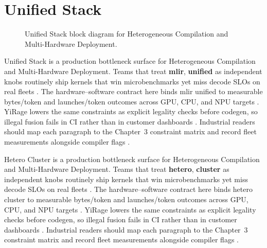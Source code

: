 \section{Unified Stack}
\label{sec:unified_stack}
\begin{figure}[t]
\centering
{}
\caption{Unified Stack block diagram for Heterogeneous Compilation and Multi-Hardware Deployment.}
\label{fig:unified_stack_architecture}
\end{figure}


Unified Stack is a production bottleneck surface for Heterogeneous Compilation and Multi-Hardware Deployment. Teams that treat \textbf{mlir}, \textbf{unified} as independent knobs routinely ship kernels that win microbenchmarks yet miss decode SLOs on real fleets \citep{taxbreak2026,semianalysis2024tma}. The hardware--software contract here binds mlir unified to measurable bytes/token and launches/token outcomes across GPU, CPU, and NPU targets \citep{memoryfloor2026,amd2024xdna}. YiRage lowers the same constraints as explicit legality checks before codegen, so illegal fusion fails in CI rather than in customer dashboards \citep{nvidia2022hopper,amd2024aie}. Industrial readers should map each paragraph to the Chapter~3 constraint matrix and record fleet measurements alongside compiler flags \citep{semianalysis2024tma,dlbook}.

Hetero Cluster is a production bottleneck surface for Heterogeneous Compilation and Multi-Hardware Deployment. Teams that treat \textbf{hetero}, \textbf{cluster} as independent knobs routinely ship kernels that win microbenchmarks yet miss decode SLOs on real fleets \citep{liu2024deepseekv3,memoryfloor2026}. The hardware--software contract here binds hetero cluster to measurable bytes/token and launches/token outcomes across GPU, CPU, and NPU targets \citep{patel2025llminference,nvidia2022hopper}. YiRage lowers the same constraints as explicit legality checks before codegen, so illegal fusion fails in CI rather than in customer dashboards \citep{taxbreak2026,semianalysis2024tma}. Industrial readers should map each paragraph to the Chapter~3 constraint matrix and record fleet measurements alongside compiler flags \citep{memoryfloor2026,amd2024xdna}.

